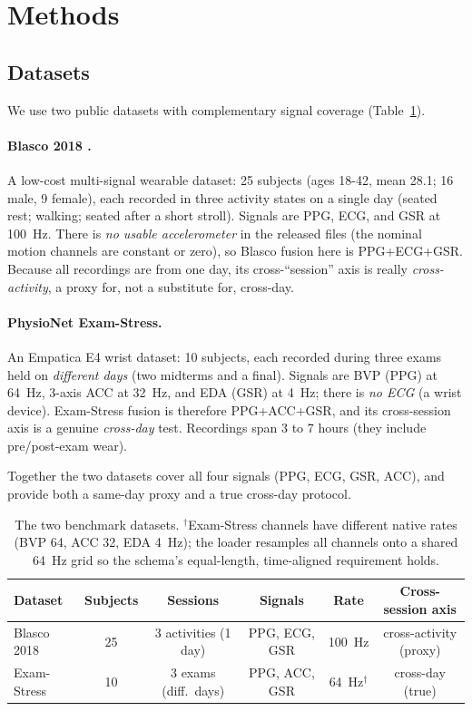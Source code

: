 \documentclass[11pt]{article}
\begin{document}
\section{Methods}
\label{sec:methods}

\subsection{Datasets}
We use two public datasets with complementary signal coverage (Table~\ref{tab:datasets}).

\paragraph{Blasco 2018 \citep{blasco2018}.} A low-cost multi-signal wearable dataset:
25 subjects (ages 18-42, mean 28.1; 16 male, 9 female), each recorded in three activity
states on a single day (seated rest; walking; seated after a short stroll). Signals are PPG,
ECG, and GSR at \SI{100}{\hertz}. There is \emph{no usable accelerometer} in the released
files (the nominal motion channels are constant or zero), so Blasco fusion here is PPG+ECG+GSR.
Because all recordings are from one day, its cross-``session'' axis is really
\emph{cross-activity}, a proxy for, not a substitute for, cross-day.

\paragraph{PhysioNet Exam-Stress.} An Empatica E4 wrist dataset: 10 subjects, each recorded
during three exams held on \emph{different days} (two midterms and a final). Signals are BVP
(PPG) at \SI{64}{\hertz}, 3-axis ACC at \SI{32}{\hertz}, and EDA (GSR) at \SI{4}{\hertz};
there is \emph{no ECG} (a wrist device). Exam-Stress fusion is therefore PPG+ACC+GSR, and its
cross-session axis is a genuine \emph{cross-day} test. Recordings span 3 to 7 hours (they
include pre/post-exam wear).

Together the two datasets cover all four signals (PPG, ECG, GSR, ACC), and provide both a
same-day proxy and a true cross-day protocol.

\begin{table}[t]
\centering
\small
\begin{tabular}{lccccc}
\toprule
Dataset & Subjects & Sessions & Signals & Rate & Cross-session axis \\
\midrule
Blasco 2018 & 25 & 3 activities (1 day) & PPG, ECG, GSR & \SI{100}{\hertz} & cross-activity (proxy) \\
Exam-Stress & 10 & 3 exams (diff.\ days) & PPG, ACC, GSR & \SI{64}{\hertz}$^\dagger$ & cross-day (true) \\
\bottomrule
\end{tabular}
\caption{The two benchmark datasets. $^\dagger$Exam-Stress channels have different native
rates (BVP 64, ACC 32, EDA \SI{4}{\hertz}); the loader resamples all channels onto a shared
\SI{64}{\hertz} grid so the schema's equal-length, time-aligned requirement holds.}
\label{tab:datasets}
\end{table}
\end{document}
